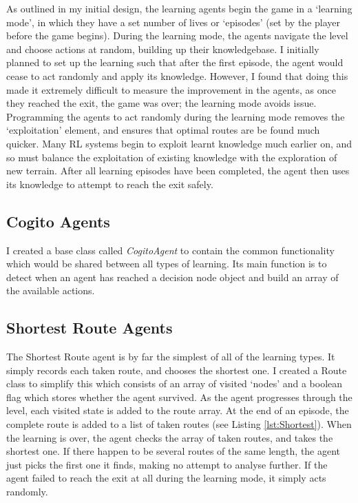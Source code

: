 \documentclass[a4paper,oneside]{report}
\begin{document}
As outlined in my initial design, the learning agents begin the game in a `learning mode', in which they have a set number of lives or `episodes' (set by the player before the game begins). During the learning mode, the agents navigate the level and choose actions at random, building up their knowledgebase. I initially planned to set up the learning such that after the first episode, the agent would cease to act randomly and apply its knowledge. However, I found that doing this made it extremely difficult to measure the improvement in the agents, as once they reached the exit, the game was over; the learning mode avoids issue. Programming the agents to act randomly during the learning mode removes the `exploitation' element, and ensures that optimal routes are be found much quicker. Many RL systems begin to exploit learnt knowledge much earlier on, and so must balance the exploitation of existing knowledge with the exploration of new terrain. After all learning episodes have been completed, the agent then uses its knowledge to attempt to reach the exit safely.

\subsection{Cogito Agents}

I created a base class called \emph{CogitoAgent} to contain the common functionality which would be shared between all types of learning. Its main function is to detect when an agent has reached a decision node object and build an array of the available actions.

\subsection{Shortest Route Agents}

The Shortest Route agent is by far the simplest of all of the learning types. It simply records each taken route, and chooses the shortest one. I created a Route class to simplify this which consists of an array of visited `nodes' and a boolean flag which stores whether the agent survived. As the agent progresses through the level, each visited state is added to the route array. At the end of an episode, the complete route is added to a list of taken routes (see Listing \ref{lst:Shortest}). When the learning is over, the agent checks the array of taken routes, and takes the shortest one. If there happen to be several routes of the same length, the agent just picks the first one it finds, making no attempt to analyse further. If the agent failed to reach the exit at all during the learning mode, it simply acts randomly.
\end{document}
